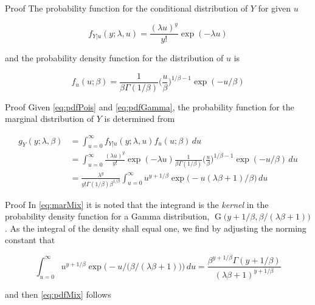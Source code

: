 \documentclass[aspectratio=169]{beamer}
\DeclareMathOperator{\G}{G}
\begin{document}
\begin{frame}{Proof}
\protect\hypertarget{proof}{}
The probability function for the conditional distribution of \(Y\) for
given \(u\)

\begin{equation} \label{eq:pdfPois}
  f_{Y|u}(y;\lambda, u)=\frac{(\lambda u)^y}{y!} \exp (-\lambda u)
\end{equation}

and the probability density function for the distribution of \(u\) is

\begin{equation} \label{eq:pdfGamma}
  f_{u}(u;\beta)=\frac{1}{\beta \Gamma(1/\beta)} \bigg(\frac{u}{\beta}\bigg)^{1/\beta-1} \exp (-u/\beta)
\end{equation}
\end{frame}

\begin{frame}{Proof}
\protect\hypertarget{proof-1}{}
Given \eqref{eq:pdfPois} and \eqref{eq:pdfGamma}, the probability
function for the marginal distribution of \(Y\) is determined from

\begin{equation} \label{eq:marMix}
  \begin{aligned}
    g_{Y}(y;\lambda,\beta)&=\int_{u=0}^\infty f_{Y|u}(y;\lambda, u) f_{u}(u;\beta) \,du \\
    &=\int_{u=0}^\infty \frac{(\lambda u)^y}{y!} \exp (-\lambda u) \frac{1}{\beta \Gamma(1/\beta)} \bigg(\frac{u}{\beta}\bigg)^{1/\beta-1} \exp (-u/\beta) \,du\\
    &=\frac{\lambda^{y}}{y!\Gamma(1/\beta)\beta^{1/\beta}} \int_{u=0}^\infty u^{y+1/\beta} \exp \big(-u(\lambda \beta+1)/\beta\big) \,du
  \end{aligned}
\end{equation}
\end{frame}

\begin{frame}{Proof}
\protect\hypertarget{proof-2}{}
In \eqref{eq:marMix} it is noted that the integrand is the \emph{kernel}
in the probability density function for a Gamma distribution,
\(\G\big(y+1/\beta,\beta/(\lambda \beta+1)\big)\). As the integral of
the density shall equal one, we find by adjusting the norming constant
that

\begin{equation}
  \int_{u=0}^\infty u^{y+1/\beta} \exp \bigg(-u/\Big(\beta/(\lambda \beta+1)\Big)\bigg) \,du = \frac{\beta^{y+1/\beta}\Gamma(y+1/\beta)}{(\lambda \beta + 1)^{y+1/\beta}}
\end{equation}

and then \eqref{eq:pdfMix} follows
\end{frame}
\end{document}
